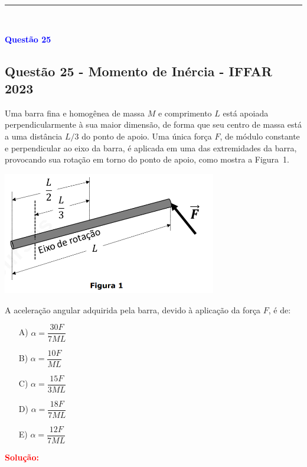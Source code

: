\noindent\rule{\linewidth}{0.6pt}\\


\begin{flushleft}
\textbf{\textcolor{blue}{\Large Quest\~ao 25 }}\\
\noindent
\subsection{Quest\~ao 25 - Momento de In\'ercia - IFFAR 2023}
Uma barra fina e homogênea de massa $M$ e comprimento $L$ está apoiada perpendicularmente
à sua maior dimensão, de forma que seu centro de massa está a uma distância $L/3$ do 
ponto de apoio. Uma única força $F$, de módulo constante e perpendicular ao eixo da 
barra, é aplicada em uma das extremidades da barra, provocando sua rotação em torno 
do ponto de apoio, como mostra a Figura~1.

\begin{center}
\includegraphics[width=0.7\textwidth]{figures/barra_momento_de_inercia.png} \\[0.3cm]
\end{center}

A aceleração angular adquirida pela barra, devido à aplicação da força $F$, é de:

\begin{itemize}
\item[A)] $\alpha = \dfrac{30F}{7ML}$
\item[B)] $\alpha = \dfrac{10F}{ML}$
\item[C)] $\alpha = \dfrac{15F}{3ML}$
\item[D)] $\alpha = \dfrac{18F}{7ML}$
\item[E)] $\alpha = \dfrac{12F}{7ML}$
\end{itemize}

\vspace{0.5cm}

\textcolor{red}{\textbf{Solução:}}\\


\end{flushleft}
